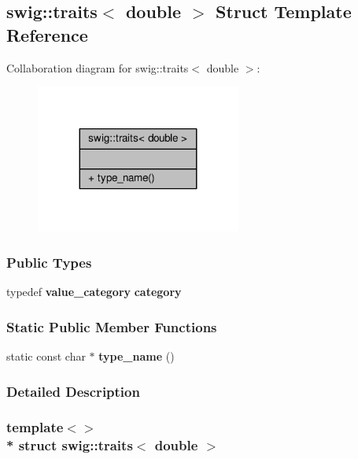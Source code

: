 \subsection{swig\+:\+:traits$<$ double $>$ Struct Template Reference}
\label{structswig_1_1traits_3_01double_01_4}


Collaboration diagram for swig\+:\+:traits$<$ double $>$\+:
\nopagebreak
\begin{figure}[H]
\begin{center}
\leavevmode
\includegraphics[width=191pt]{d5/d9e/structswig_1_1traits_3_01double_01_4__coll__graph}
\end{center}
\end{figure}
\subsubsection*{Public Types}
\begin{DoxyCompactItemize}
\item 
typedef {\bf value\+\_\+category} {\bf category}
\end{DoxyCompactItemize}
\subsubsection*{Static Public Member Functions}
\begin{DoxyCompactItemize}
\item 
static const char $\ast$ {\bf type\+\_\+name} ()
\end{DoxyCompactItemize}


\subsubsection{Detailed Description}
\subsubsection*{template$<$$>$\\*
struct swig\+::traits$<$ double $>$}



